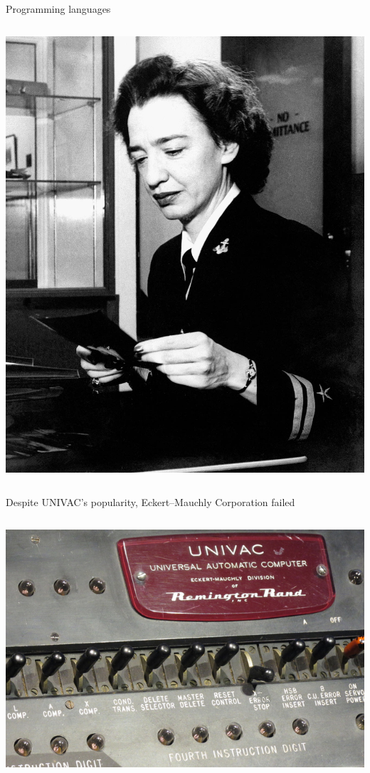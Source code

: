 \documentclass[aspectratio=169]{beamer}
\begin{document}
\begin{frame}[fragile]{Programming languages}
\begin{columns}
\vspace{0.6 cm}
\includegraphics[width=\linewidth]{PLOTS/Grace-Murray-Hopper-Bureau-of-Ordnance-Computation-1946.jpg}
\vspace{0.6 cm}
\end{columns}
\end{frame}

\begin{frame}{Despite UNIVAC's popularity, Eckert–Mauchly Corporation failed}
\vspace{0.165 cm}
\begin{columns}
\includegraphics[width=\linewidth]{PLOTS/univac_front_panel.jpg}
\end{columns}
\end{frame}
\end{document}
